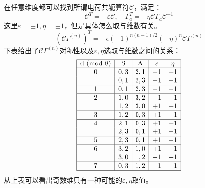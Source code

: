 在任意维度都可以找到所谓电荷共轭算符$\mathcal{C}$，满足：
\begin{equation}
	\mathcal{C}^T=-\varepsilon\mathcal{C},\quad\Gamma_a^T=-\eta\mathcal{C}\Gamma_a\mathcal{C}^{-1}
\end{equation}
这里$\varepsilon=\pm1,\eta=\pm1$，但是具体怎么取与维数有关。
\begin{equation}
	\left(\mathcal{C}\Gamma^{(n)}\right)^T=-\epsilon(-1)^{n(n-1)/2}(-\eta)^n\mathcal{C}\Gamma^{(n)}
\end{equation}
下表给出了$\mathcal{C}\Gamma^{(n)}$对称性以及$\varepsilon,\eta$选取与维数之间的关系：
\begin{equation*}
	\begin{array}{|c|c|c|cc|}\hline\text{d (mod 8)}&\text{S}&\text{A}&\varepsilon&\eta\\\hline0&0,3&2,1&-1&+1\\&0,1&2,3&-1&-1\\\hline1&0,1&2,3&-1&-1\\\hline2&1,0&3,2&-1&-1\\&1,2&3,0&+1&+1\\\hline3&1,2&0,3&+1&+1\\\hline4&2,1&0,3&+1&+1\\&2,3&0,1&+1&-1\\\hline5&2,3&0,1&+1&-1\\\hline6&3,2&1,0&+1&-1\\&3,0&1,2&-1&+1\\\hline7&0,3&1,2&-1&+1\\\hline\end{array}
\end{equation*}
从上表可以看出奇数维只有一种可能的$\varepsilon,\eta$取值。

